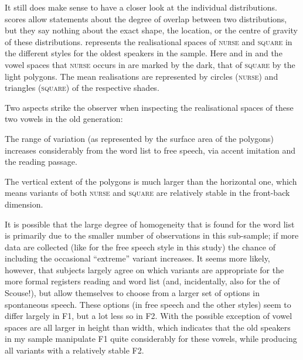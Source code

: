 It still does make sense to have a closer look at the individual distributions.
 scores allow statements about the degree of overlap between two distributions, but they say nothing about the exact shape, the location, or the centre of gravity of these distributions.
 represents the realisational spaces of \textsc{nurse} and \textsc{square} in the different styles for the oldest speakers in the sample.
Here and in  and  the vowel spaces that \textsc{nurse} occurs in are marked by the dark, that of \textsc{square} by the light polygons.
The mean realisations are represented by circles (\textsc{nurse}) and triangles (\textsc{square}) of the respective shades.

Two aspects strike the observer when inspecting the realisational spaces of these two vowels in the old generation:
\begin{inparaenum}[(1)]
	\item The range of variation (as represented by the surface area of the polygons) increases considerably from the word list to free speech, via accent imitation and the reading passage.
	\item The vertical extent of the polygons is much larger than the horizontal one, which means variants of both \textsc{nurse} and \textsc{square} are relatively stable in the front-back dimension.
\end{inparaenum}
It is possible that the large degree of homogeneity that is found for the word list is primarily due to the smaller number of observations in this sub-sample; if more data are collected (like for the free speech style in this study) the chance of including the occasional ``extreme'' variant increases.
It seems more likely, however, that subjects largely agree on which variants are appropriate for the more formal registers reading and word list (and, incidentally, also for the  of Scouse!), but allow themselves to choose from a larger set of options in spontaneous speech.
These options (in free speech and the other styles) seem to differ largely in F1, but a lot less so in F2.
With the possible exception of  vowel spaces are all larger in height than width, which indicates that the old speakers in my sample manipulate F1 quite considerably for these vowels, while producing all variants with a relatively stable F2.

